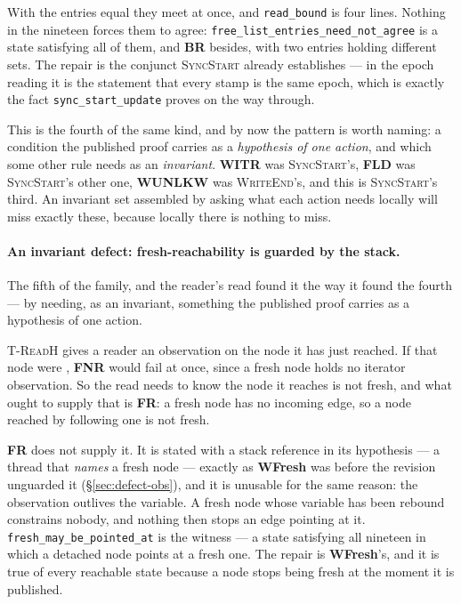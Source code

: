 With the entries equal they meet at once, and \texttt{read\_bound} is four
lines.  Nothing in the nineteen forces them to agree:
\texttt{free\_list\_entries\_need\_not\_agree} is a state satisfying all of
them, and \textbf{BR} besides, with two entries holding different sets.  The
repair is the conjunct \textsc{SyncStart} already establishes --- in the epoch
reading it is the statement that every stamp is the same epoch, which is exactly
the fact \texttt{sync\_start\_update} proves on the way through.

This is the fourth of the same kind, and by now the pattern is worth naming: a
condition the published proof carries as a \emph{hypothesis of one action}, and
which some other rule needs as an \emph{invariant}.  \textbf{WITR} was
\textsc{SyncStart}'s, \textbf{FLD} was \textsc{SyncStart}'s other one,
\textbf{WUNLKW} was \textsc{WriteEnd}'s, and this is \textsc{SyncStart}'s third.
An invariant set assembled by asking what each action needs locally will miss
exactly these, because locally there is nothing to miss.

\paragraph{An invariant defect: fresh-reachability is guarded by the stack.}
\label{sec:defect-frw}
The fifth of the family, and the reader's read found it the way it found the
fourth --- by needing, as an invariant, something the published proof carries as
a hypothesis of one action.

\textsc{T-ReadH} gives a reader an \itr{} observation on the node it has just
reached.  If that node were \frsh{}, \textbf{FNR} would fail at once, since a
fresh node holds no iterator observation.  So the read needs to know the node it
reaches is not fresh, and what ought to supply that is \textbf{FR}: a fresh node
has no incoming edge, so a node reached by following one is not fresh.

\textbf{FR} does not supply it.  It is stated with a stack reference in its
hypothesis --- a thread that \emph{names} a fresh node --- exactly as
\textbf{WFresh} was before the revision unguarded it (\S\ref{sec:defect-obs}),
and it is unusable for the same reason: the observation outlives the variable.
A fresh node whose variable has been rebound constrains nobody, and nothing then
stops an edge pointing at it.  \texttt{fresh\_may\_be\_pointed\_at} is the
witness --- a state satisfying all nineteen in which a detached node points at a
fresh one.  The repair is \textbf{WFresh}'s, and it is true of every reachable
state because a node stops being fresh at the moment it is published.

